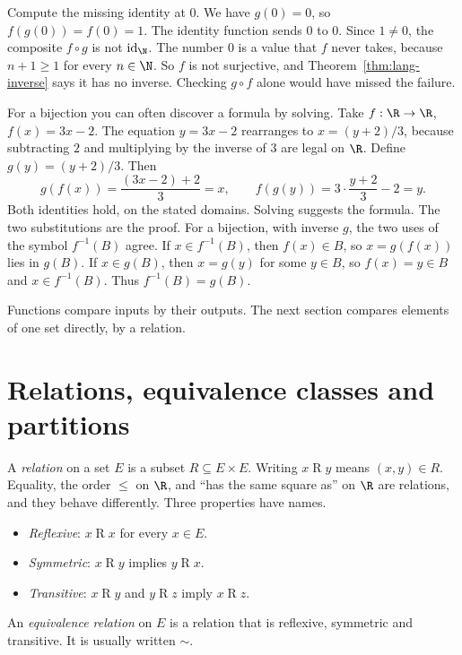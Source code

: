 Compute the missing identity at $0$. We have $g(0)=0$, so $f(g(0))=f(0)=1$. The identity function sends $0$ to $0$. Since $1\ne 0$, the composite $f\circ g$ is not $\operatorname{id}_{\N}$. The number $0$ is a value that $f$ never takes, because $n+1\ge 1$ for every $n\in\N$. So $f$ is not surjective, and Theorem~\ref{thm:lang-inverse} says it has no inverse. Checking $g\circ f$ alone would have missed the failure.

For a bijection you can often discover a formula by solving. Take $f:\R\to\R$, $f(x)=3x-2$. The equation $y=3x-2$ rearranges to $x=(y+2)/3$, because subtracting $2$ and multiplying by the inverse of $3$ are legal on $\R$. Define $g(y)=(y+2)/3$. Then
\[
g(f(x))=\frac{(3x-2)+2}{3}=x,\qquad f(g(y))=3\cdot\frac{y+2}{3}-2=y.
\]
Both identities hold, on the stated domains. Solving suggests the formula. The two substitutions are the proof. For a bijection, with inverse $g$, the two uses of the symbol $f^{-1}(B)$ agree. If $x\in f^{-1}(B)$, then $f(x)\in B$, so $x=g(f(x))$ lies in $g(B)$. If $x\in g(B)$, then $x=g(y)$ for some $y\in B$, so $f(x)=y\in B$ and $x\in f^{-1}(B)$. Thus $f^{-1}(B)=g(B)$.

Functions compare inputs by their outputs. The next section compares elements of one set directly, by a relation.

\section{Relations, equivalence classes and partitions}

A \emph{relation} on a set $E$ is a subset $R\subseteq E\times E$. Writing $x\mathrel R y$ means $(x,y)\in R$. Equality, the order $\le$ on $\R$, and ``has the same square as'' on $\R$ are relations, and they behave differently. Three properties have names.
\begin{itemize}
\item \emph{Reflexive}: $x\mathrel R x$ for every $x\in E$.
\item \emph{Symmetric}: $x\mathrel R y$ implies $y\mathrel R x$.
\item \emph{Transitive}: $x\mathrel R y$ and $y\mathrel R z$ imply $x\mathrel R z$.
\end{itemize}

\begin{definitionx}
An \emph{equivalence relation} on $E$ is a relation that is reflexive, symmetric and transitive. It is usually written $\sim$.
\end{definitionx}

